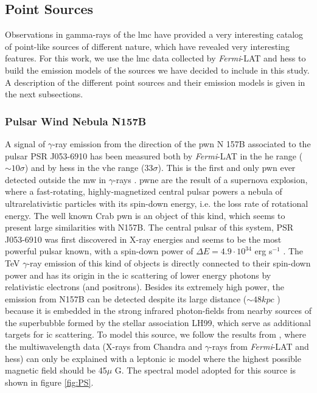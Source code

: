 \documentclass[main.tex]{subfiles}
\begin{document}
\subsection{Point Sources}\label{sec:point}

Observations in gamma-rays of the \gls{lmc} have provided a very interesting catalog of point-like sources of different nature, which have revealed very interesting features. For this work, we use the \gls{lmc} data collected by \textit{Fermi}-LAT \cite{2010FermiLATLMC11months} \cite{2016LMCFermiLAT} and \gls{hess} \cite{2012HESSLMC} \cite{2015HESSTeVLMC} \cite{2017HESSLMCP3} to build the emission models of the sources we have decided to include in this study. A description of the different point sources and their emission models is given in the next subsections.

\subsubsection{Pulsar Wind Nebula N157B}

A signal of $\gamma$-ray emission from the direction of the \gls{pwn} N 157B associated to the pulsar  PSR J053-6910 has been measured both by \textit{Fermi}-LAT in the \gls{he} range ($\sim 10 \sigma$) and by \gls{hess} in the \gls{vhe} range ($33 \sigma$). This is the first and only \gls{pwn} ever detected outside the \gls{mw} in $\gamma$-rays \cite{2012HESSN157B}. \gls{pwne} are the result of a supernova explosion, where a fast-rotating, highly-magnetized central pulsar powers a nebula of ultrarelativistic particles with its spin-down energy, i.e. the loss rate of rotational energy. The well known Crab \gls{pwn} is an object of this kind, which seems to present large similarities with N157B. The central pulsar of this system, PSR J053-6910 was first discovered in X-ray energies and seems to be the most powerful pulsar known, with a spin-down power of $\Delta E = 4.9 \cdot 10^{34} $ erg s$^{-1}$ \cite{1998PulsarN157B}. The TeV $\gamma$-ray emission of this kind of objects is directly connected to their spin-down power and has its origin in the \gls{ic} scattering of lower energy photons by relativistic electrons (and positrons). Besides its extremely high power, the emission from N157B can be detected despite its large distance ($\sim 48 kpc$ \cite{2006N157Bdistance}) because it is embedded in the strong infrared photon-fields from nearby sources of the superbubble formed by the stellar association LH99, which serve as additional targets for \gls{ic} scattering.
To model this source, we follow the results from \cite{2015HESSTeVLMC}, where the multiwavelength data (X-rays from Chandra \cite{2001ChandraN157B} and $\gamma$-rays from \textit{Fermi}-LAT and \gls{hess}) can only be explained with a leptonic \gls{ic} model where the highest possible magnetic field should be 45$\mu$ G. The  spectral model adopted for this source is shown in figure \ref{fig:PS}.
\end{document}
